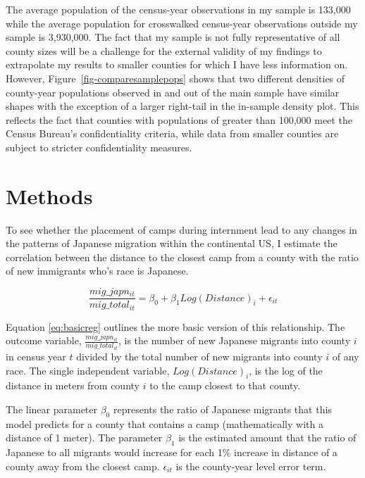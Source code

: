\documentclass[12pt]{article}
\begin{document}
The average population of the census-year observations in my sample is
133,000 while the average population for
crosswalked census-year observations outside my sample is
3,930,000. The fact that my sample is not
fully representative of all county sizes will be a challenge for the
external validity of my findings to extrapolate my results to smaller
counties for which I have less information on. However,
Figure~\ref{fig-comparesamplepops} shows that two different densities of
county-year populations observed in and out of the main sample have
similar shapes with the exception of a larger right-tail in the
in-sample density plot. This reflects the fact that counties with
populations of greater than 100,000 meet the Census Bureau's
confidentiality criteria, while data from smaller counties are subject
to stricter confidentiality measures.

\section{Methods}\label{methods}

To see whether the placement of camps during internment lead to any changes in the patterns of Japanese migration within the continental US, I estimate the correlation between the distance to the closest camp from a county with the ratio of new immigrants who's race is Japanese. 

\begin{equation}\label{eq:basicreg}
    \frac{mig\_japn_{it}}{mig\_total_{it}} = \beta_0 + \beta_1 Log(Distance)_i  +  \epsilon_{it}
\end{equation}


Equation \ref{eq:basicreg} outlines the more basic version of this relationship. 
The outcome variable, $\frac{mig\_japn_{it}}{mig\_total_{it}}$, is the number of new Japanese migrants into county $i$ in census year $t$ divided by the total number of new migrants into county $i$ of any race.
The single independent variable, $Log(Distance)_i$, is the log of the distance in meters from county $i$ to the camp closest to that county.

The linear parameter $\beta_0$ represents the ratio of Japanese migrants that this model predicts for a county that contains a camp (mathematically with a distance of 1 meter).
The parameter $\beta_1$ is the estimated amount that the ratio of Japanese to all migrants would increase for each 1\% increase in distance of a county away from the closest camp.
$\epsilon_{it}$ is the county-year level error term.
\end{document}
